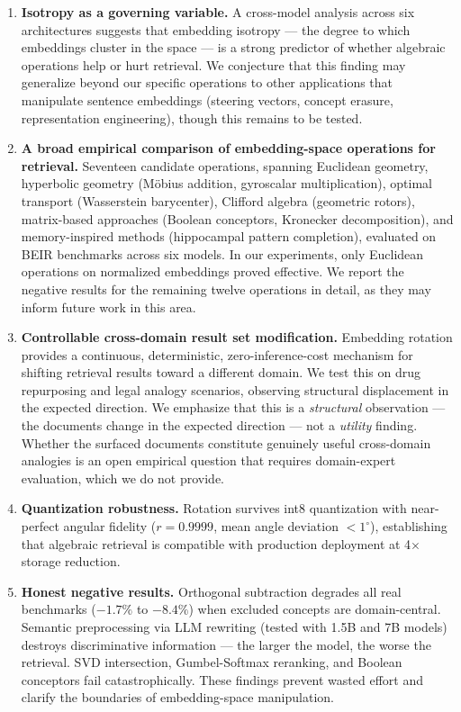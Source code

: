\documentclass{article}
\begin{document}
\begin{enumerate}
\item \textbf{Isotropy as a governing variable.} A cross-model analysis across six architectures suggests that embedding isotropy --- the degree to which embeddings cluster in the space --- is a strong predictor of whether algebraic operations help or hurt retrieval. We conjecture that this finding may generalize beyond our specific operations to other applications that manipulate sentence embeddings (steering vectors, concept erasure, representation engineering), though this remains to be tested.

\item \textbf{A broad empirical comparison of embedding-space operations for retrieval.} Seventeen candidate operations, spanning Euclidean geometry, hyperbolic geometry (M\"{o}bius addition, gyroscalar multiplication), optimal transport (Wasserstein barycenter), Clifford algebra (geometric rotors), matrix-based approaches (Boolean conceptors, Kronecker decomposition), and memory-inspired methods (hippocampal pattern completion), evaluated on BEIR benchmarks across six models. In our experiments, only Euclidean operations on normalized embeddings proved effective. We report the negative results for the remaining twelve operations in detail, as they may inform future work in this area.

\item \textbf{Controllable cross-domain result set modification.} Embedding rotation provides a continuous, deterministic, zero-inference-cost mechanism for shifting retrieval results toward a different domain. We test this on drug repurposing and legal analogy scenarios, observing structural displacement in the expected direction. We emphasize that this is a \emph{structural} observation --- the documents change in the expected direction --- not a \emph{utility} finding. Whether the surfaced documents constitute genuinely useful cross-domain analogies is an open empirical question that requires domain-expert evaluation, which we do not provide.

\item \textbf{Quantization robustness.} Rotation survives int8 quantization with near-perfect angular fidelity ($r = 0.9999$, mean angle deviation $< 1^{\circ}$), establishing that algebraic retrieval is compatible with production deployment at 4$\times$ storage reduction.

\item \textbf{Honest negative results.} Orthogonal subtraction degrades all real benchmarks ($-1.7\%$ to $-8.4\%$) when excluded concepts are domain-central. Semantic preprocessing via LLM rewriting (tested with 1.5B and 7B models) destroys discriminative information --- the larger the model, the worse the retrieval. SVD intersection, Gumbel-Softmax reranking, and Boolean conceptors fail catastrophically. These findings prevent wasted effort and clarify the boundaries of embedding-space manipulation.
\end{enumerate}
\end{document}
